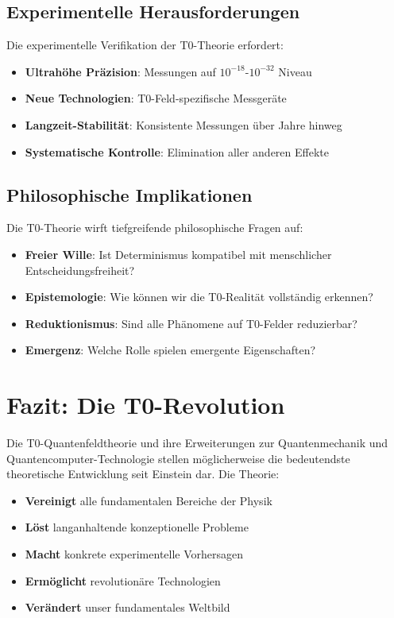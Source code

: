 \documentclass[12pt,a4paper]{article}
\begin{document}
	\subsection{Experimentelle Herausforderungen}
	
	Die experimentelle Verifikation der T0-Theorie erfordert:
	
	\begin{itemize}
		\item \textbf{Ultrahöhe Präzision}: Messungen auf $10^{-18}$-$10^{-32}$ Niveau
		\item \textbf{Neue Technologien}: T0-Feld-spezifische Messgeräte
		\item \textbf{Langzeit-Stabilität}: Konsistente Messungen über Jahre hinweg
		\item \textbf{Systematische Kontrolle}: Elimination aller anderen Effekte
	\end{itemize}
	
	\subsection{Philosophische Implikationen}
	
	Die T0-Theorie wirft tiefgreifende philosophische Fragen auf:
	
	\begin{itemize}
		\item \textbf{Freier Wille}: Ist Determinismus kompatibel mit menschlicher Entscheidungsfreiheit?
		\item \textbf{Epistemologie}: Wie können wir die T0-Realität vollständig erkennen?
		\item \textbf{Reduktionismus}: Sind alle Phänomene auf T0-Felder reduzierbar?
		\item \textbf{Emergenz}: Welche Rolle spielen emergente Eigenschaften?
	\end{itemize}
	
	\section{Fazit: Die T0-Revolution}
	
	Die T0-Quantenfeldtheorie und ihre Erweiterungen zur Quantenmechanik und Quantencomputer-Technologie stellen möglicherweise die bedeutendste theoretische Entwicklung seit Einstein dar. Die Theorie:
	
	\begin{itemize}
		\item \textbf{Vereinigt} alle fundamentalen Bereiche der Physik
		\item \textbf{Löst} langanhaltende konzeptionelle Probleme
		\item \textbf{Macht} konkrete experimentelle Vorhersagen
		\item \textbf{Ermöglicht} revolutionäre Technologien
		\item \textbf{Verändert} unser fundamentales Weltbild
	\end{itemize}
	
\end{document}
